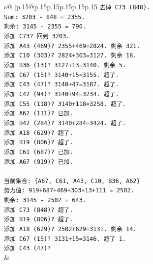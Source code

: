 \documentclass{article}
\begin{document}
{\begin{supertabular}{c@{$\;$}|p{.15\linewidth}@{}p{.15\linewidth}p{.15\linewidth}p{.15\linewidth}p{.15\linewidth}p{.15\linewidth}}
{{{\texttt{去掉 C73 (848).} \\
\texttt{Sum: 3203 {-} 848 = 2355.} \\
\texttt{剩余: 3145 {-} 2355 = 790.} \\
\texttt{添加 C73? 回到 3203.} \\
\texttt{添加 A43 (469)? 2355+469=2824. 剩余 321.} \\
\texttt{添加 C10 (303)? 2824+303=3127. 剩余 18.} \\
\texttt{添加 B36 (13)? 3127+13=3140. 剩余 5.} \\
\texttt{添加 C67 (15)? 3140+15=3155. 超了.} \\
\texttt{添加 C43 (47)? 3140+47=3187. 超了.} \\
\texttt{添加 C42 (94)? 3140+94=3234. 超了.} \\
\texttt{添加 C55 (118)? 3140+118=3258. 超了.} \\
\texttt{添加 A62 (111)? 已加.} \\
\texttt{添加 B42 (284)? 3140+284=3424. 超了.} \\
\texttt{添加 A18 (629)? 超了.} \\
\texttt{添加 B19 (806)? 超了.} \\
\texttt{添加 C61 (687)? 已加.} \\
\texttt{添加 A67 (919)? 已加.} \\
\\ 
\texttt{当前集合: \{A67, C61, A43, C10, B36, A62\}} \\
\texttt{努力值: 919+687+469+303+13+111 = 2502.} \\
\texttt{剩余: 3145 {-} 2502 = 643.} \\
\texttt{添加 C73 (848)? 超了.} \\
\texttt{添加 B19 (806)? 超了.} \\
\texttt{添加 A18 (629)? 2502+629=3131. 剩余 14.} \\
\texttt{添加 C67 (15)? 3131+15=3146. 超了 1.} \\
\texttt{添加 C43 (47)?} \\
            }
        }
    }
    & \\ \\


\end{supertabular}}
\end{document}
